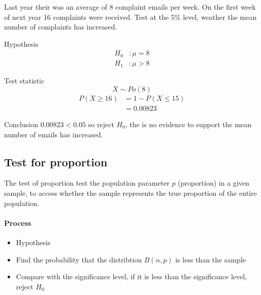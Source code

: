         \begin{example}
        {
            Last year their was an average of 8 complaint emails per week. On the first week of next year 16 complaints were received. Test at the 5\% level, weather the mean number of complaints has increased.
        }

        \begin{step}{Hypothesis}
        \begin{align*}
        H_0&: \mu = 8 \\ 
        H_1&: \mu > 8
        \end{align*}
        \end{step}

        \begin{step}{Test statistic}
        $$ X \sim Po(8) $$
        \begin{align*} 
        P(X \geq 16) &= 1 - P(X \leq 15) \\ 
        &= 0.00823 
        \end{align*}         
        \end{step}

        \begin{step}{Conclusion}
            $0.00823 < 0.05$ so reject $H_0$, the is no evidence to support the mean number of emails has increased.
        \end{step}

        \end{example}


    \subsection{Test for proportion}
        The test of proportion test the population parameter $p$ (proportion) in a given sample, to access whether the sample represents the true proportion of the entire population.

        \paragraph{Process}
        \begin{itemize}
        \item Hypothesis
        \item Find the probability that the distribtion $B(n, p)$ is less than the sample
        \item Compare with the significance level, if it is less than the significance level, reject $H_0$
        \end{itemize}
    
